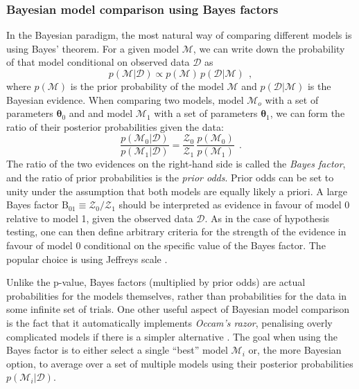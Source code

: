 \documentclass[12pt,dvipsnames]{report}
\renewcommand{\vec}[1]{\boldsymbol{\mathbf{#1}}}
\newcommand{\hquad}{~~}
\begin{document}
\subsubsection{Bayesian model comparison using Bayes factors}
In the Bayesian paradigm, the most natural way of comparing different 
models is using Bayes' theorem. For a given model $\mathcal{M}$, we can write down the 
probability of that model conditional on observed data $\mathcal{D}$ as
\begin{equation}
    p(\mathcal{M}\lvert\mathcal D)\propto p(\mathcal{M})\,p(\mathcal D\lvert\mathcal{M})
    \hquad,
\end{equation}
where $p(\mathcal{M})$ is the prior probability of the model $\mathcal{M}$ and
$p(\mathcal D\lvert\mathcal{M})$ is the Bayesian evidence. 
When comparing two models, model $\mathcal{M}_o$ with a set of parameters $\vec\theta_0$ and
and model $\mathcal{M}_1$ with a set of parameters $\vec\theta_1$, we can form the ratio of 
their posterior probabilities given the data:
\begin{equation}
    \frac{p(\mathcal{M}_0\lvert\mathcal D)}{p(\mathcal{M}_1\lvert\mathcal D)} =
    \frac{\mathcal{Z}_0}{\mathcal{Z}_1} \, \frac{p(\mathcal{M}_0)}{p(\mathcal{M}_1)}
    \hquad .
\end{equation}
The ratio of the two evidences on the right-hand side is called the 
\emph{Bayes factor}, and the ratio of prior probabilities is the 
\emph{prior odds}.
Prior odds can be set to unity under the assumption that both models are equally 
likely a priori.
A large Bayes factor $\textrm{B}_{01}\equiv \mathcal{Z}_0/\mathcal{Z}_1$ should 
be interpreted as evidence in favour of model 0 relative to model 1, given the 
observed data $\mathcal D$.
As in the case of hypothesis testing, one can then define arbitrary criteria for
the strength of the evidence in favour of model 0 conditional on the specific value
of the Bayes factor.
The popular choice is using Jeffreys scale \citep{1939thpr.book.....J}.

Unlike the p-value, Bayes factors (multiplied by prior odds)
are actual probabilities for the models
themselves, rather than probabilities for the data in some infinite set of trials.
One other useful aspect of Bayesian model comparison is the fact that it automatically
implements \emph{Occam's razor}, penalising overly complicated models if there
is a simpler alternative \citep[see Chapter 28 of][]{2003itil.book.....M}.
The goal when using the Bayes factor is to either select a single ``best'' model
$\mathcal{M}_i$ or, the more Bayesian option, to average over a set of 
multiple models using their  posterior probabilities 
$p(\mathcal{M}_i\lvert\mathcal D)$.
\end{document}
